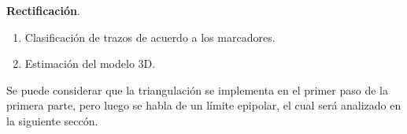 \documentclass[11pt,letterpaper]{article}     %
\begin{document}
\textbf{Rectificaci\' on}.
\begin{enumerate} 
\item Clasificaci\' on de trazos de acuerdo a los marcadores.
\item Estimaci\' on del modelo 3D.
\end{enumerate}

Se puede considerar que la triangulaci\' on se implementa en el primer paso de la primera parte, pero luego se habla de un l\' imite epipolar, el cual ser\' a analizado en la siguiente secc\' on.










\end{document}
